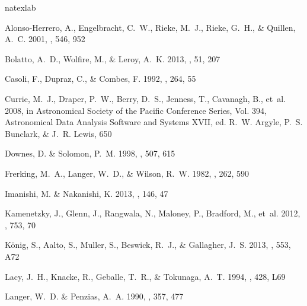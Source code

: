 \documentclass[preprint, 11pt]{aastex}
\begin{document}
\begin{thebibliography}{28}
\expandafter\ifx\csname natexlab\endcsname\relax\def\natexlab#1{#1}\fi

{Alonso-Herrero}, A., {Engelbracht}, C.~W., {Rieke}, M.~J., {Rieke}, G.~H., \&
  {Quillen}, A.~C. 2001, \apj, 546, 952

{Bolatto}, A.~D., {Wolfire}, M., \& {Leroy}, A.~K. 2013, \araa, 51, 207

{Casoli}, F., {Dupraz}, C., \& {Combes}, F. 1992, \aap, 264, 55

{Currie}, M.~J., {Draper}, P.~W., {Berry}, D.~S., {Jenness}, T., {Cavanagh},
  B., {et~al.} 2008, in Astronomical Society of the Pacific Conference Series,
  Vol. 394, Astronomical Data Analysis Software and Systems XVII, ed. R.~W.
  {Argyle}, P.~S. {Bunclark}, \& J.~R. {Lewis}, 650

{Downes}, D. \& {Solomon}, P.~M. 1998, \apj, 507, 615

{Frerking}, M.~A., {Langer}, W.~D., \& {Wilson}, R.~W. 1982, \apj, 262, 590

{Imanishi}, M. \& {Nakanishi}, K. 2013, \aj, 146, 47

{Kamenetzky}, J., {Glenn}, J., {Rangwala}, N., {Maloney}, P., {Bradford}, M.,
  {et~al.} 2012, \apj, 753, 70

{K{\"o}nig}, S., {Aalto}, S., {Muller}, S., {Beswick}, R.~J., \& {Gallagher},
  J.~S. 2013, \aap, 553, A72

{Lacy}, J.~H., {Knacke}, R., {Geballe}, T.~R., \& {Tokunaga}, A.~T. 1994,
  \apjl, 428, L69

{Langer}, W.~D. \& {Penzias}, A.~A. 1990, \apj, 357, 477


\end{thebibliography}
\end{document}
